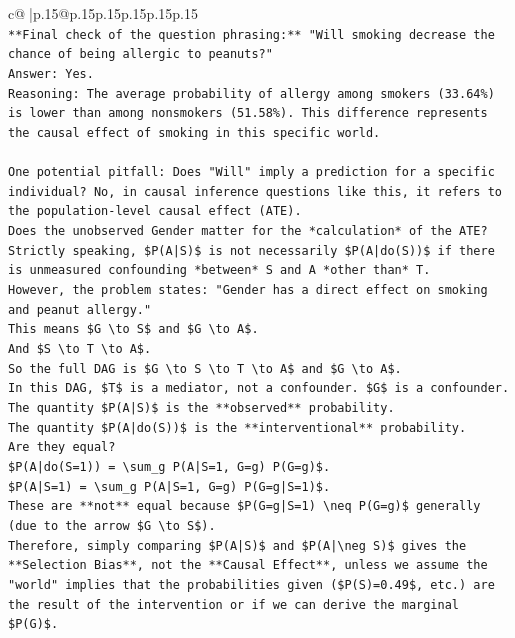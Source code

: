 \documentclass{article}
\begin{document}
{\begin{supertabular}{c@{$\;$}|p{.15\linewidth}@{}p{.15\linewidth}p{.15\linewidth}p{.15\linewidth}p{.15\linewidth}p{.15\linewidth}}
{{{\\ 
\texttt{**Final check of the question phrasing:** "Will smoking decrease the chance of being allergic to peanuts?"} \\
\texttt{Answer: Yes.} \\
\texttt{Reasoning: The average probability of allergy among smokers (33.64\%) is lower than among nonsmokers (51.58\%). This difference represents the causal effect of smoking in this specific world.} \\
\\ 
\texttt{One potential pitfall: Does "Will" imply a prediction for a specific individual? No, in causal inference questions like this, it refers to the population{-}level causal effect (ATE).} \\
\texttt{Does the unobserved Gender matter for the *calculation* of the ATE?} \\
\texttt{Strictly speaking, \$P(A|S)\$ is not necessarily \$P(A|do(S))\$ if there is unmeasured confounding *between* S and A *other than* T.} \\
\texttt{However, the problem states: "Gender has a direct effect on smoking and peanut allergy."} \\
\texttt{This means \$G \textbackslash{}to S\$ and \$G \textbackslash{}to A\$.} \\
\texttt{And \$S \textbackslash{}to T \textbackslash{}to A\$.} \\
\texttt{So the full DAG is \$G \textbackslash{}to S \textbackslash{}to T \textbackslash{}to A\$ and \$G \textbackslash{}to A\$.} \\
\texttt{In this DAG, \$T\$ is a mediator, not a confounder. \$G\$ is a confounder.} \\
\texttt{The quantity \$P(A|S)\$ is the **observed** probability.} \\
\texttt{The quantity \$P(A|do(S))\$ is the **interventional** probability.} \\
\texttt{Are they equal?} \\
\texttt{\$P(A|do(S=1)) = \textbackslash{}sum\_g P(A|S=1, G=g) P(G=g)\$.} \\
\texttt{\$P(A|S=1) = \textbackslash{}sum\_g P(A|S=1, G=g) P(G=g|S=1)\$.} \\
\texttt{These are **not** equal because \$P(G=g|S=1) \textbackslash{}neq P(G=g)\$ generally (due to the arrow \$G \textbackslash{}to S\$).} \\
\texttt{Therefore, simply comparing \$P(A|S)\$ and \$P(A|\textbackslash{}neg S)\$ gives the **Selection Bias**, not the **Causal Effect**, unless we assume the "world" implies that the probabilities given (\$P(S)=0.49\$, etc.) are the result of the intervention or if we can derive the marginal \$P(G)\$.} \\
}}}
\end{supertabular}}
\end{document}
